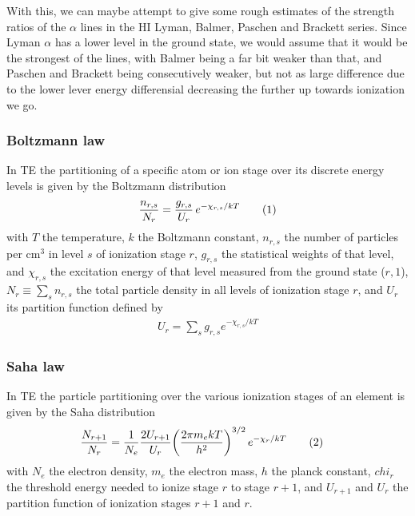 \documentclass{article}
\newcommand\numberthis{\addtocounter{equation}{1}\tag{\theequation}}
\begin{document}
With this, we can maybe attempt to give some rough estimates of the strength ratios of the $\alpha$ lines in the HI Lyman, Balmer, Paschen and Brackett series. Since Lyman $\alpha$ has a lower level in the ground state, we would assume that it would be the strongest of the lines, with Balmer being a far bit weaker than that, and Paschen and Brackett being consecutively weaker, but not as large difference due to the lower lever energy differensial decreasing the further up towards ionization we go.

\subsubsection*{Boltzmann law}
In TE the partitioning of a specific atom or ion stage over its discrete energy levels is given by the Boltzmann distribution
\begin{align*}
  \frac{n_{r,s}}{N_r} = \frac{g_{r,s}}{U_r}\,e^{-\chi_{r,s}/kT}\numberthis\label{eq:boltzmann}
\end{align*}
with $T$ the temperature, $k$ the Boltzmann constant, $n_{r,s}$ the number of particles per cm$^3$ in level $s$ of ionization stage $r$, $g_{r,s}$ the statistical weights of that level, and $\chi_{r,s}$ the excitation energy of that level measured from the ground state ($r,1$), $N_r \equiv\sum_sn_{r,s}$ the total particle density in all levels of ionization stage $r$, and $U_r$ its partition function defined by
\begin{align*}
  U_r = \sum_sg_{r,s}e^{-\chi_{r,s}/kT}
\end{align*}

\subsubsection*{Saha law}
In TE the particle partitioning over the various ionization stages of an element is given by the Saha distribution
\begin{align*}
  \frac{N_{r+1}}{N_r} &= \frac{1}{N_e}\frac{2U_{r+1}}{U_r}\bigg(\frac{2\pi m_ekT}{h^2}\bigg)^{3/2}\,e^{-\chi_r/kT} \numberthis\label{eq:saha}
\end{align*}
with $N_e$ the electron density, $m_e$ the electron mass, $h$ the planck constant, $chi_r$ the threshold energy needed to ionize stage $r$ to stage $r+1$, and $U_{r+1}$ and $U_r$ the partition function of ionization stages $r+1$ and $r$.
\end{document}
